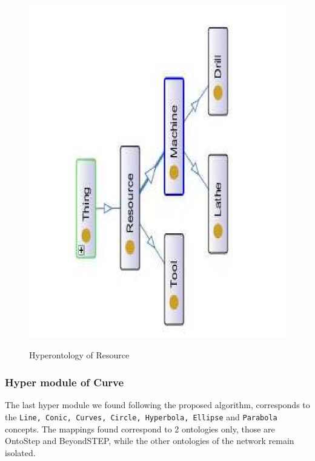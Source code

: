 \begin{figure}
\begin{center}
	\includegraphics[scale=0.5, angle=270]{figure-chapterIV/fig4-25}\\
	\vspace{-40mm}
	\caption{Hyperontology of Resource}
	\label{figure4-25}
\end{center}
\end{figure}

\subsubsection{Hyper module of Curve}\label{subsubsection4.2.5.5}


The last hyper module we found following the proposed algorithm, corresponds to the  \texttt{Line, Conic, Curves, Circle, Hyperbola, Ellipse} and \texttt{Parabola} concepts. The mappings found correspond to 2 ontologies only, those are OntoStep and BeyondSTEP, while the other ontologies of the network remain isolated. 

